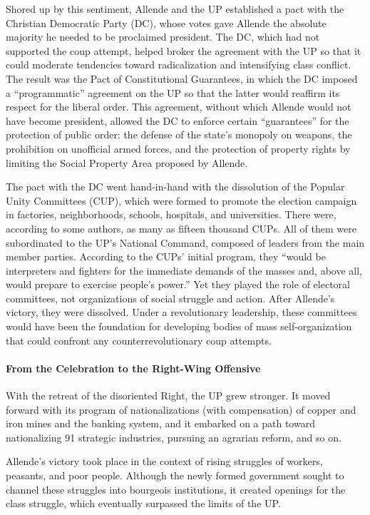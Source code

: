 Shored up by this sentiment, Allende and the UP established a pact with the Christian Democratic Party (DC), whose votes gave Allende the absolute majority he needed to be proclaimed president. The DC, which had not supported the coup attempt, helped broker the agreement with the UP so that it could moderate tendencies toward radicalization and intensifying class conflict. The result was the Pact of Constitutional Guarantees, in which the DC imposed a ``programmatic'' agreement on the UP so that the latter would reaffirm its respect for the liberal order. This agreement, without which Allende would not have become president, allowed the DC to enforce certain ``guarantees'' for the protection of public order: the defense of the state's monopoly on weapons, the prohibition on unofficial armed forces, and the protection of property rights by limiting the Social Property Area proposed by Allende.

The pact with the DC went hand-in-hand with the dissolution of the Popular Unity Committees (CUP), which were formed to promote the election campaign in factories, neighborhoods, schools, hospitals, and universities. There were, according to some authors, as many as fifteen thousand CUPs. All of them were subordinated to the UP's National Command, composed of leaders from the main member parties. According to the CUPs' initial program, they ``would be interpreters and fighters for the immediate demands of the masses and, above all, would prepare to exercise people's power.'' Yet they played the role of electoral committees, not organizations of social struggle and action. After Allende's victory, they were dissolved. Under a revolutionary leadership, these committees would have been the foundation for developing bodies of mass self-organization that could confront any counterrevolutionary coup attempts.

\paragraph{From the Celebration to the Right-Wing Offensive}

With the retreat of the disoriented Right, the UP grew stronger. It moved forward with its program of nationalizations (with compensation) of copper and iron mines and the banking system, and it embarked on a path toward nationalizing 91 strategic industries, pursuing an agrarian reform, and so on.

Allende's victory took place in the context of rising struggles of workers, peasants, and poor people. Although the newly formed government sought to channel these struggles into bourgeois institutions, it created openings for the class struggle, which eventually surpassed the limits of the UP.

